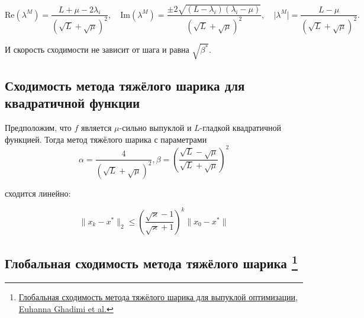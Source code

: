 \documentclass[
  russian,
  letterpaper,
  DIV=11,
  numbers=noendperiod]{scrartcl}
\begin{document}
\[
\text{Re}(\lambda^M) = \dfrac{L + \mu - 2\lambda_i}{(\sqrt{L} + \sqrt{\mu})^2}, \quad \text{Im}(\lambda^M) = \dfrac{\pm 2\sqrt{(L - \lambda_i)(\lambda_i - \mu)}}{(\sqrt{L} + \sqrt{\mu})^2}, \quad \lvert \lambda^M \rvert = \dfrac{L - \mu}{(\sqrt{L} + \sqrt{\mu})^2}.
\]

И скорость сходимости не зависит от шага и равна \(\sqrt{\beta^*}\).

\subsection{Сходимость метода тяжёлого шарика для квадратичной
функции}\label{ux441ux445ux43eux434ux438ux43cux43eux441ux442ux44c-ux43cux435ux442ux43eux434ux430-ux442ux44fux436ux451ux43bux43eux433ux43e-ux448ux430ux440ux438ux43aux430-ux434ux43bux44f-ux43aux432ux430ux434ux440ux430ux442ux438ux447ux43dux43eux439-ux444ux443ux43dux43aux446ux438ux438-1}

\begin{tcolorbox}[enhanced jigsaw, titlerule=0mm, opacityback=0, toptitle=1mm, colback=white, bottomtitle=1mm, toprule=.15mm, opacitybacktitle=0.6, title=\textcolor{quarto-callout-color}{\faInfo}\hspace{0.5em}{Theorem}, rightrule=.15mm, left=2mm, breakable, coltitle=black, arc=.35mm, leftrule=.75mm, colbacktitle=quarto-callout-color!10!white, bottomrule=.15mm, colframe=quarto-callout-color-frame]

Предположим, что \(f\) является \(\mu\)-сильно выпуклой и \(L\)-гладкой
квадратичной функцией. Тогда метод тяжёлого шарика с параметрами \[
\alpha = \dfrac{4}{(\sqrt{L} + \sqrt{\mu})^2}, \beta = \left(\dfrac{\sqrt{L} - \sqrt{\mu}}{\sqrt{L} + \sqrt{\mu}}\right)^2
\]

сходится линейно:

\[
\|x_k - x^*\|_2 \leq \left( \dfrac{\sqrt{\varkappa} - 1}{\sqrt{\varkappa} + 1} \right)^k \|x_0 - x^*\|
\]

\end{tcolorbox}

\subsection[Глобальная сходимость метода тяжёлого шарика
]{\texorpdfstring{Глобальная сходимость метода тяжёлого шарика
\footnote{\href{https://arxiv.org/abs/1412.7457}{Глобальная сходимость
  метода тяжёлого шарика для выпуклой оптимизации, Euhanna Ghadimi et
  al.}}}{Глобальная сходимость метода тяжёлого шарика }}\label{ux433ux43bux43eux431ux430ux43bux44cux43dux430ux44f-ux441ux445ux43eux434ux438ux43cux43eux441ux442ux44c-ux43cux435ux442ux43eux434ux430-ux442ux44fux436ux451ux43bux43eux433ux43e-ux448ux430ux440ux438ux43aux430}
\end{document}
